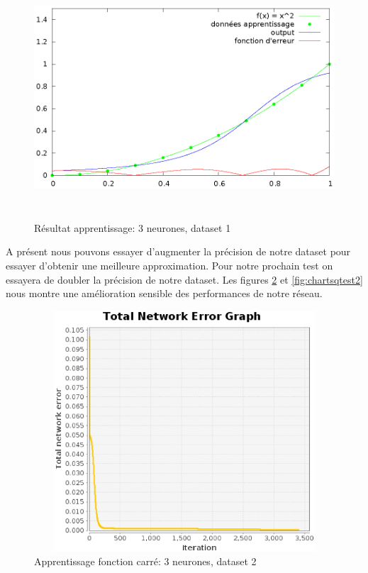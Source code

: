 \documentclass[twoside,openright,a4paper,11pt,french]{article}
\begin{document}
\begin{figure}[ht]
\centering
\includegraphics[width=12cm,height=9cm]{./pics/chartsqtest1.eps}
\caption{Résultat apprentissage: 3 neurones, dataset 1}
\label{fig:chartsqtest1}
\end{figure}

A présent nous pouvons essayer d'augmenter la précision de notre dataset
pour essayer d'obtenir une meilleure approximation. Pour notre 
prochain test on essayera de doubler la précision de notre dataset.
Les figures \ref{fig:sqtest2} et \ref{fig:chartsqtest2} nous montre 
une amélioration sensible des performances de notre réseau. 



\begin{figure}[ht]
\centering
\includegraphics[width=12cm,height=9cm]{./pics/sqtest2.eps}
\caption{Apprentissage fonction carré: 3 neurones, dataset 2}
\label{fig:sqtest2}
\end{figure}
\end{document}
